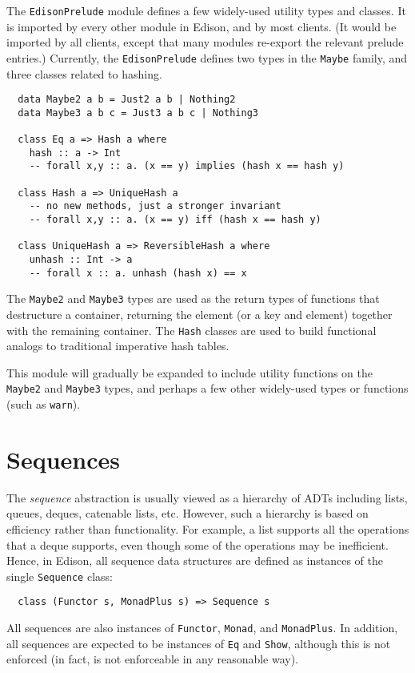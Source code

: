 \documentclass{report}
\newcommand{\cd}{\texttt}
\begin{document}
The \cd{EdisonPrelude} module defines a few widely-used
utility types and classes.  It is imported by every other module 
in Edison, and by most clients.  (It would be imported by all clients,
except that many modules re-export the relevant prelude entries.)
Currently, the \cd{EdisonPrelude} defines two types in the
\cd{Maybe} family, and three classes related to hashing.
%
\begin{verbatim}
  data Maybe2 a b = Just2 a b | Nothing2
  data Maybe3 a b c = Just3 a b c | Nothing3

  class Eq a => Hash a where
    hash :: a -> Int
    -- forall x,y :: a. (x == y) implies (hash x == hash y)

  class Hash a => UniqueHash a
    -- no new methods, just a stronger invariant
    -- forall x,y :: a. (x == y) iff (hash x == hash y)

  class UniqueHash a => ReversibleHash a where
    unhash :: Int -> a
    -- forall x :: a. unhash (hash x) == x
\end{verbatim}
%
The \cd{Maybe2} and \cd{Maybe3} types are used as the return types of 
functions that destructure a container, returning the element (or a key and 
element) together with the remaining container.
The \cd{Hash} classes are used to build functional analogs to
traditional imperative hash tables.

This module will gradually be expanded to include utility functions
on the \cd{Maybe2} and \cd{Maybe3} types, and perhaps a few other 
widely-used types or functions (such as \cd{warn}).


\chapter{Sequences}

The \emph{sequence} abstraction is usually viewed as a hierarchy of
ADTs including lists, queues, deques, catenable lists, etc.  However,
such a hierarchy is based on efficiency rather than functionality.
For example, a list supports all the operations that a deque supports,
even though some of the operations may be inefficient.  Hence, in
Edison, all sequence data structures are defined as instances of
the single \cd{Sequence} class:
\begin{verbatim}
  class (Functor s, MonadPlus s) => Sequence s
\end{verbatim}
All sequences are also instances of \cd{Functor}, \cd{Monad},
and \cd{MonadPlus}.  In addition, all sequences
are expected to be instances of \cd{Eq} and \cd{Show},
although this is not enforced (in fact, is not enforceable in any
reasonable way).
\end{document}
